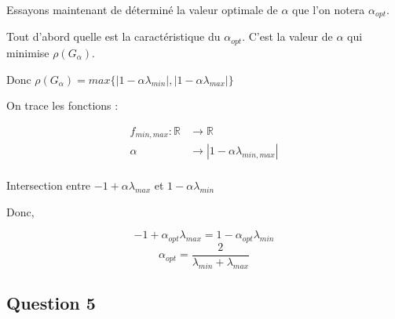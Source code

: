 \documentclass[11pt]{article}
\begin{document}
Essayons maintenant de déterminé la valeur optimale de $\alpha$ que
l'on notera $\alpha_{opt}$.\newline

\vspace{5mm}

Tout d'abord quelle est la caractéristique du $\alpha_{opt}$. C'est la
valeur de $\alpha$ qui minimise $\rho(G_{\alpha})$.\newline

\vspace{5mm}

Donc $ \rho(G_{\alpha}) = max\{|1 - \alpha \lambda_{min}|, |1 - \alpha
\lambda_{max}|\} $\newline

\vspace{5mm}

On trace les fonctions :

\begin{equation*}
  \begin{split}
    f_{min, max} : \mathbb{R} & \rightarrow
    \mathbb{R}\\
    \alpha & \rightarrow | 1 - \alpha
    \lambda_{min, max} | \\
  \end{split}
\end{equation*}

Intersection entre $-1 + \alpha \lambda_{max}$ et $1 - \alpha
\lambda_{min}$ \newline

\vspace{5mm}

Donc,

$$ -1 + \alpha_{opt} \lambda_{max} = 1 - \alpha_{opt} \lambda_{min} $$
$$ \alpha_{opt} = \frac{2}{\lambda_{min} + \lambda_{max}} $$

\subsection{Question 5}
\end{document}

